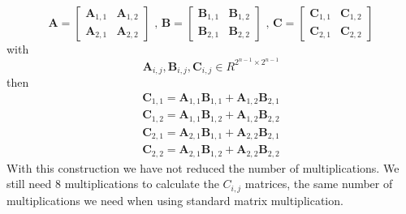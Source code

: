 \documentclass{article}
\begin{document}
$$
\mathbf{A} =
\begin{bmatrix}
\mathbf{A}_{1,1} & \mathbf{A}_{1,2} \\
\mathbf{A}_{2,1} & \mathbf{A}_{2,2}
\end{bmatrix}
\mbox { , }
\mathbf{B} =
\begin{bmatrix}
\mathbf{B}_{1,1} & \mathbf{B}_{1,2} \\
\mathbf{B}_{2,1} & \mathbf{B}_{2,2}
\end{bmatrix}
\mbox { , }
\mathbf{C} =
\begin{bmatrix}
\mathbf{C}_{1,1} & \mathbf{C}_{1,2} \\
\mathbf{C}_{2,1} & \mathbf{C}_{2,2}
\end{bmatrix}
$$
with
$$
\mathbf{A}_{i,j}, \mathbf{B}_{i,j}, \mathbf{C}_{i,j} \in R^{2^{n-1} \times 2^{n-1}}
$$
then
$$
\begin{aligned}
\mathbf{C}_{1,1} = \mathbf{A}_{1,1} \mathbf{B}_{1,1} + \mathbf{A}_{1,2} \mathbf{B}_{2,1} \\
\mathbf{C}_{1,2} = \mathbf{A}_{1,1} \mathbf{B}_{1,2} + \mathbf{A}_{1,2} \mathbf{B}_{2,2} \\
\mathbf{C}_{2,1} = \mathbf{A}_{2,1} \mathbf{B}_{1,1} + \mathbf{A}_{2,2} \mathbf{B}_{2,1} \\
\mathbf{C}_{2,2} = \mathbf{A}_{2,1} \mathbf{B}_{1,2} + \mathbf{A}_{2,2} \mathbf{B}_{2,2}
\end{aligned}
$$
With this construction we have not reduced the number of multiplications.
We still need $8$ multiplications to calculate the $C_{i,j}$ matrices, the same number of multiplications we need when using standard matrix multiplication.
\end{document}
